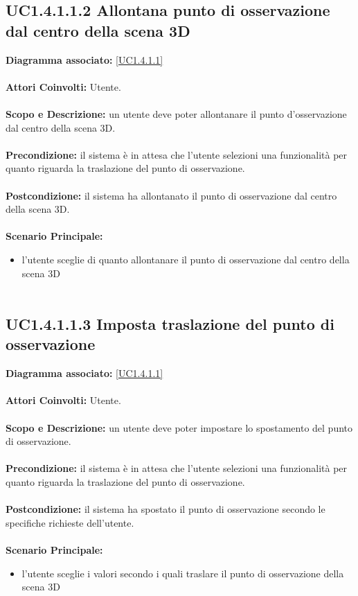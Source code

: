 \subsection{UC1.4.1.1.2 Allontana punto di osservazione dal centro della scena 3D}
\textbf{Diagramma associato:}
\ref{UC1.4.1.1} \\ \\
\textbf{Attori Coinvolti:}
Utente. \\ \\
\textbf{Scopo e Descrizione:}
un utente deve poter allontanare il punto d'osservazione dal centro della scena 3D. \\ \\
\textbf{Precondizione:}
il sistema è in attesa che l'utente selezioni una funzionalità per quanto riguarda la traslazione del punto di osservazione. \\ \\
\textbf{Postcondizione:}
il sistema ha allontanato il punto di osservazione dal centro della scena 3D. \\ \\
\textbf{Scenario Principale:}
\begin{itemize}
\item l'utente sceglie di quanto allontanare il punto di osservazione dal centro della scena 3D
\\ \\ \end{itemize}


\subsection{UC1.4.1.1.3 Imposta traslazione del punto di osservazione}
\textbf{Diagramma associato:}
\ref{UC1.4.1.1} \\ \\
\textbf{Attori Coinvolti:}
Utente. \\ \\
\textbf{Scopo e Descrizione:}
un utente deve poter impostare lo spostamento del punto di osservazione. \\ \\
\textbf{Precondizione:}
il sistema è in attesa che l'utente selezioni una funzionalità per quanto riguarda la traslazione del punto di osservazione. \\ \\
\textbf{Postcondizione:}
il sistema ha spostato il punto di osservazione secondo le specifiche richieste dell'utente. \\ \\
\textbf{Scenario Principale:}
\begin{itemize}
\item l'utente sceglie i valori secondo i quali traslare il punto di osservazione della scena 3D
\\ \\ \end{itemize}


